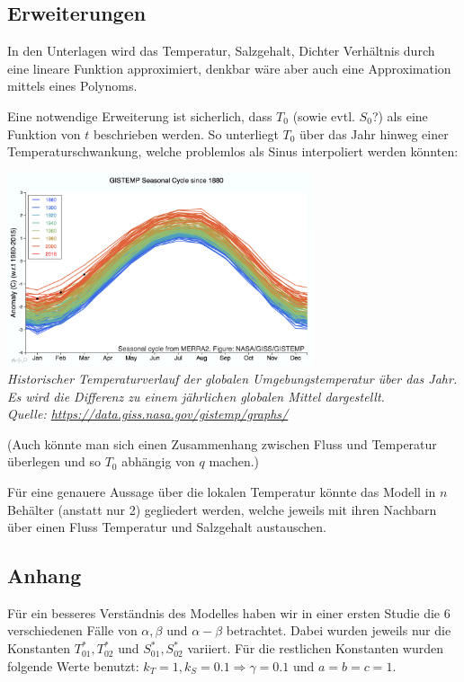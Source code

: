 \documentclass[10pt,a4paper]{article}
\begin{document}
	\newpage
	\subsection*{Erweiterungen}
	
	In den Unterlagen wird das Temperatur, Salzgehalt, Dichter Verhältnis durch eine lineare Funktion approximiert, denkbar wäre aber auch eine Approximation mittels eines Polynoms.
	
	Eine notwendige Erweiterung ist sicherlich, dass \(T_0\) (sowie evtl. \(S_0\)?) als eine Funktion von \(t\) beschrieben werden. So unterliegt \(T_0\) über das Jahr hinweg einer Temperaturschwankung, welche problemlos als Sinus interpoliert werden könnten:
	
	\begin{center}
	\includegraphics[width=9cm]{Diagramme/GISTEMP.png} \\
	\textit{Historischer Temperaturverlauf der globalen Umgebungstemperatur über das Jahr. Es wird die Differenz zu einem jährlichen globalen Mittel dargestellt.  \\
	Quelle: \url{https://data.giss.nasa.gov/gistemp/graphs/}}
	\end{center}	
	
	(Auch könnte man sich einen Zusammenhang zwischen Fluss und Temperatur überlegen und so \(T_0\) abhängig von \(q\) machen.)
	
	Für eine genauere Aussage über die lokalen Temperatur könnte das Modell in \(n\) Behälter (anstatt nur 2) gegliedert werden, welche jeweils mit ihren Nachbarn über einen Fluss Temperatur und Salzgehalt austauschen.
	
	\newpage
	\subsection*{Anhang}
	
	Für ein besseres Verständnis des Modelles haben wir in einer ersten Studie die 6 verschiedenen Fälle von \(\alpha, \beta \) und \(\alpha - \beta\) betrachtet. Dabei wurden jeweils nur die Konstanten \(T^*_{01}, T^*_{02}\) und \(S^*_{01}, S^*_{02}\) variiert. Für die restlichen Konstanten wurden folgende Werte benutzt: \(k_T = 1, k_S = 0.1 \Rightarrow \gamma = 0.1\) und \(a = b = c = 1 \). 
	
\end{document}
